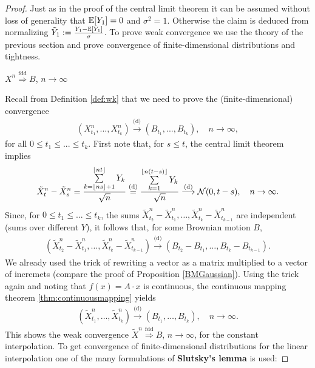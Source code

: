 \begin{proof}[Proof]
	Just as in the proof of the central limit theorem it can be assumed without loss of generality that $\mathbb{E}[Y_1]=0$ and $\sigma^2=1$. Otherwise the claim is deduced from normalizing $\tilde Y_1:= \frac{Y_1-\mathbb{E}[Y_1]}{\sigma}$. To prove weak convergence we use the theory of the previous section and prove convergence of finite-dimensional distributions and tightness.
	\begin{lstep}
		$X^n \overset{\text{fdd}}{\Longrightarrow} B$, $n\to\infty$
	\end{lstep}
	Recall from Definition \ref{def:wk} that we need to prove the (finite-dimensional) convergence
	\begin{align}
		(X_{t_1}^n,..., X_{t_k}^n)\overset{\text{(d)}}{\rightarrow}(B_{t_1},..., B_{t_k}) ,\quad n\to\infty,
	\end{align}
	for all $0\leq t_1\leq...\leq t_k$. First note that, for $s\leq t$, the central limit theorem implies
			\begin{align*}
				\tilde{X}_t^n - \tilde{X}_s^n = \frac{\sum\limits_{k= \lfloor ns \rfloor + 1 }^{\lfloor nt \rfloor}Y_k}{\sqrt{n}} \overset{\text{(d)}}{=} \frac{\sum\limits_{k= 1}^{\lfloor n(t-s) \rfloor}Y_k}{\sqrt{n}} \overset{\text{(d)}}{\longrightarrow} \mathcal{N}(0,t-s),\quad n\to\infty.
			\end{align*}
			Since, for $0\leq t_1 \leq ... \leq t_k$, the sums $\tilde{X}_{t_2}^n - \tilde{X}_{t_1}^n, \dots , \tilde{X}_{t_k}^n - \tilde{X}_{t_{k-1}}^n$ are independent (sums over different $Y$), it follows that, for some Brownian motion $B$,
			\begin{align*}
				\left(\tilde{X}_{t_2}^n - \tilde{X}_{t_1}^n, \dots , \tilde{X}_{t_k}^n - \tilde{X}_{t_{k-1}}^n \right) \overset{\text{(d)}}{\longrightarrow} \left( B_{t_2}-B_{t_1}, \dots , B_{t_k} - B_{t_{k-1}}\right).
			\end{align*}
			We already used the trick of rewriting a vector as a matrix multiplied to a vector of incremets (compare the proof of Proposition \ref{BMGaussian}). Using the trick again and noting that $f(x) = A \cdot x$ is continuous, the continuous mapping theorem \ref{thm:continuousmapping} yields
			\begin{align*}
				\left(\tilde{X}_{t_1}^n,\dots , \tilde{X}_{t_k}^n\right) \overset{\text{(d)}}{\longrightarrow} \left( B_{t_1},\dots , B_{t_k}\right),\quad n\to\infty.
			\end{align*}
			This shows the weak convergence $\tilde{X}^n \overset{\text{fdd}}{\Longrightarrow} B$, $n\to\infty$, for the constant interpolation. To get convergence of finite-dimensional distributions for the linear interpolation one of the many formulations of \textbf{Slutsky's lemma} is used:

\end{proof}
